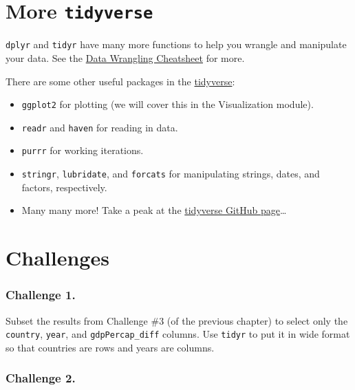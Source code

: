 \documentclass[]{book}
\providecommand{\tightlist}{%
  \setlength{\itemsep}{0pt}\setlength{\parskip}{0pt}}
\begin{document}
\section{\texorpdfstring{More
\texttt{tidyverse}}{More tidyverse}}\label{more-tidyverse}

\texttt{dplyr} and \texttt{tidyr} have many more functions to help you
wrangle and manipulate your data. See the
\href{https://www.rstudio.com/wp-content/uploads/2015/02/data-wrangling-cheatsheet.pdf}{Data
Wrangling Cheatsheet} for more.

There are some other useful packages in the
\href{http://www.tidyverse.org}{tidyverse}:

\begin{itemize}
\tightlist
\item
  \texttt{ggplot2} for plotting (we will cover this in the Visualization
  module).
\item
  \texttt{readr} and \texttt{haven} for reading in data.
\item
  \texttt{purrr} for working iterations.
\item
  \texttt{stringr}, \texttt{lubridate}, and \texttt{forcats} for
  manipulating strings, dates, and factors, respectively.
\item
  Many many more! Take a peak at the
  \href{https://github.com/tidyverse}{tidyverse GitHub page}\ldots{}
\end{itemize}

\section{Challenges}\label{challenges-7}

\subsubsection*{Challenge 1.}\label{challenge-1.-4}

Subset the results from Challenge \#3 (of the previous chapter) to
select only the \texttt{country}, \texttt{year}, and
\texttt{gdpPercap\_diff} columns. Use \texttt{tidyr} to put it in wide
format so that countries are rows and years are columns.

\subsubsection*{Challenge 2.}\label{challenge-2.-3}
\end{document}
